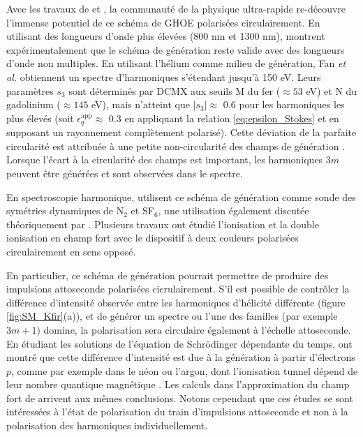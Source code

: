 Avec les travaux de  et , la communauté de la physique ultra-rapide re-découvre l'immense potentiel de ce schéma de GHOE polarisées circulairement. En utilisant des longueurs d'onde plus élevées (800 nm et 1300 nm),  montrent expérimentalement que le schéma de génération reste valide avec des longueurs d'onde non multiples. En utilisant l'hélium comme milieu de génération, Fan \textit{et al.} obtiennent un spectre d'harmoniques s'étendant jusqu'à 150 eV. Leurs paramètres $s_3$ sont déterminés par DCMX aux seuils M du fer ($\approx 53$ eV) et N du gadolinium ($\approx 145$ eV), mais n'atteint que $|s_3| \approx$ 0.6 pour les harmoniques les plus élevés (soit $\epsilon_{q}^{\text{app}} \approx$ 0.3 en appliquant la relation \ref{eq:epsilon_Stokes} et en supposant un rayonnement complètement polarisé). Cette déviation de la parfaite circularité est attribuée à une petite non-circularité des champs de génération . Lorsque l'écart à la circularité des champs est important, les harmoniques $3m$ peuvent être générées et sont observées dans le spectre.

En spectroscopie harmonique,  utilisent ce schéma de génération comme sonde des symétries dynamiques de N$_2$ et SF$_6$, une utilisation également discutée théoriquement par . Plusieurs travaux ont étudié l'ionisation  et la double ionisation  en champ fort avec le dispositif à deux couleurs polarisées circulairement en sens opposé.

En particulier, ce schéma de génération pourrait permettre de produire des impulsions attoseconde polarisées cicrulairement. S'il est possible de contrôler la différence d'intensité observée entre les harmoniques d'hélicité différente (figure \ref{fig:SM_Kfir}(a)), et de générer un spectre ou l'une des familles (par exemple $3m+1$) domine, la polarisation sera circulaire également à l'échelle attoseconde. En étudiant les solutions de l'équation de Schrödinger dépendante du temps,  ont montré que cette différence d'intensité est due à la génération à partir d'électrons $p$, comme par exemple dans le néon ou l'argon, dont l'ionisation tunnel dépend de leur nombre quantique magnétique . Les calculs dans l'approximation du champ fort de  arrivent aux mêmes conclusions. Notons cependant que ces études se sont intéressées à l'état de polarisation du train d'impulsions attoseconde et non à la polarisation des harmoniques individuellement. 

